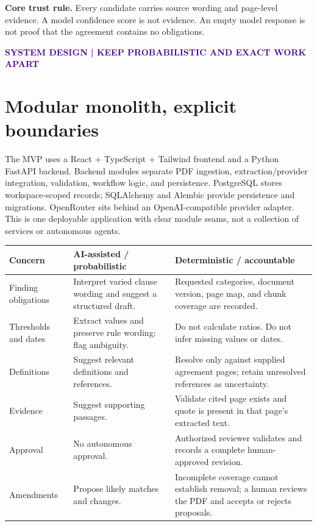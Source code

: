 \documentclass[10pt]{article}
\newcommand{\eyebrow}[1]{\textcolor{indigo}{\small\bfseries\MakeUppercase{#1}}}
\newcommand{\callout}[1]{\noindent\colorbox{pale}{\parbox{\dimexpr\linewidth-2\fboxsep}{#1}}}
\begin{document}
\callout{\textbf{Core trust rule.} Every candidate carries source wording and page-level evidence. A model confidence score is not evidence. An empty model response is not proof that the agreement contains no obligations.}

\newpage
\eyebrow{System design | Keep probabilistic and exact work apart}
\section{Modular monolith, explicit boundaries}
The MVP uses a React + TypeScript + Tailwind frontend and a Python FastAPI backend. Backend modules separate PDF ingestion, extraction/provider integration, validation, workflow logic, and persistence. PostgreSQL stores workspace-scoped records; SQLAlchemy and Alembic provide persistence and migrations. OpenRouter sits behind an OpenAI-compatible provider adapter. This is one deployable application with clear module seams, not a collection of services or autonomous agents.

\begin{tabularx}{\linewidth}{@{}p{1.6in}XX@{}}
\toprule
Concern & AI-assisted / probabilistic & Deterministic / accountable\\
\midrule
Finding obligations & Interpret varied clause wording and suggest a structured draft. & Requested categories, document version, page map, and chunk coverage are recorded.\\
Thresholds and dates & Extract values and preserve rule wording; flag ambiguity. & Do not calculate ratios. Do not infer missing values or dates.\\
Definitions & Suggest relevant definitions and references. & Resolve only against supplied agreement pages; retain unresolved references as uncertainty.\\
Evidence & Suggest supporting passages. & Validate cited page exists and quote is present in that page's extracted text.\\
Approval & No autonomous approval. & Authorized reviewer validates and records a complete human-approved revision.\\
Amendments & Propose likely matches and changes. & Incomplete coverage cannot establish removal; a human reviews the PDF and accepts or rejects proposals.\\
\bottomrule
\end{tabularx}
\end{document}

